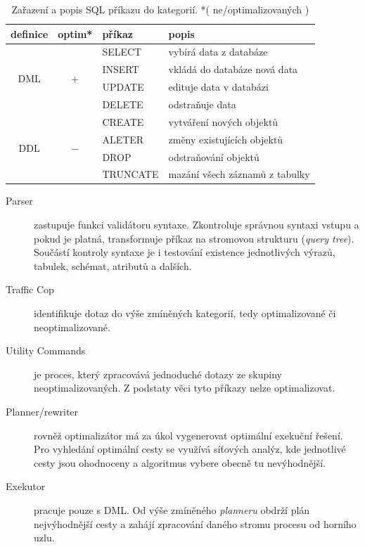 \documentclass[a4paper,12pt,oneside]{report}
\begin{document}
\begin{table}[h]
   \centering
\begin{tabular}{|ccll|}
\hline
definice & optim* & příkaz & popis \\ \hline \hline
\multirow{4}{*}{DML} & \multirow{4}{*}{$+$} & SELECT & vybírá data z databáze \\
 &  & INSERT & vkládá do databáze nová data \\
 &  & UPDATE & edituje data v databázi \\
 &  & DELETE & odstraňuje data \\ \hline
\multirow{4}{*}{DDL} & \multirow{4}{*}{$-$} & CREATE & vytváření nových objektů \\
 &  & ALETER & změny existujících objektů \\
 &  & DROP & odstraňování objektů \\
 &  & TRUNCATE & mazání všech záznamů z tabulky \\ \hline
\end{tabular}

\caption{Zařazení a popis SQL příkazu do kategorií.
*( ne/optimalizovaných )}
\label{tab:prikazy}
\end{table}


\begin{description}
\item[Parser]zastupuje funkci validátoru syntaxe. Zkontroluje správnou
  syntaxi vstupu a pokud je platná, transformuje příkaz na stromovou
  strukturu (\textit{query tree}). Součástí kontroly syntaxe je i
  testování existence jednotlivých výrazů, tabulek, schémat, atributů
  a dalších.

\item[Traffic Cop] identifikuje dotaz do výše zmíněných kategorií,
  tedy optimalizované či neoptimalizované.

\item[Utility Commands] je proces, který zpracovává jednoduché dotazy
  ze skupiny neoptimalizovaných. Z podstaty věci tyto příkazy nelze
  optimalizovat.

\item[Planner/rewriter] rovněž optimalizátor má za úkol vygenerovat
  optimální exekuční řešení. Pro vyhledání optimální cesty se využívá
  síťových analýz, kde jednotlivé cesty jsou ohodnoceny a algoritmus
  vybere obecně tu nevýhodnější.

\item[Exekutor] pracuje pouze s  \acs{DML}.  Od výše zmíněného
  \textit{planneru} obdrží plán nejvýhodnější cesty a zahájí zpracování daného stromu procesu od horního uzlu.
\end{description}
\end{document}
